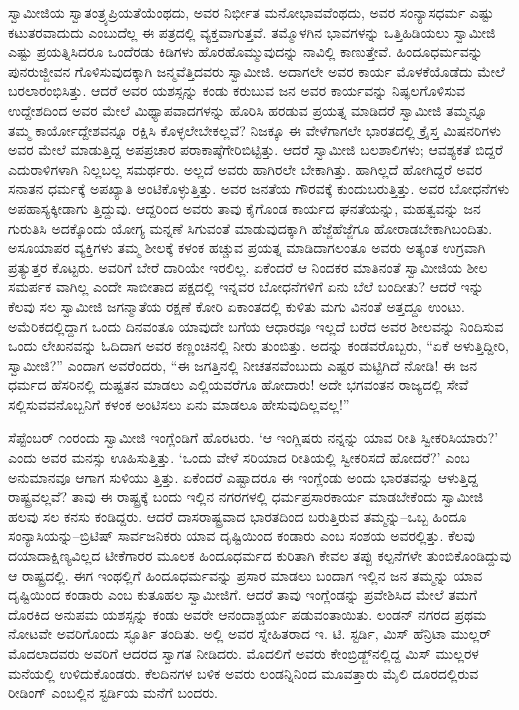ಸ್ವಾಮೀಜಿಯ ಸ್ವಾತಂತ್ರ್ಯಪ್ರಿಯತೆಯೆಂಥದು, ಅವರ ನಿರ್ಭೀತ ಮನೋಭಾವವೆಂಥದು, ಅವರ ಸಂನ್ಯಾಸಧರ್ಮ ಎಷ್ಟು ಕಟುತರವಾದುದು ಎಂಬುದೆಲ್ಲ ಈ ಪತ್ರದಲ್ಲಿ ವ್ಯಕ್ತವಾಗುತ್ತವೆ. ತಮ್ಮೊಳಗಿನ ಭಾವಗಳನ್ನು ಒತ್ತಿಹಿಡಿಯಲು ಸ್ವಾಮೀಜಿ ಎಷ್ಟು ಪ್ರಯತ್ನಿಸಿದರೂ ಒಂದೆರಡು ಕಿಡಿಗಳು ಹೊರಹೊಮ್ಮುವುದನ್ನು ನಾವಿಲ್ಲಿ ಕಾಣುತ್ತೇವೆ. ಹಿಂದೂಧರ್ಮವನ್ನು ಪುನರುಜ್ಜೀವನ ಗೊಳಿಸುವುದಕ್ಕಾಗಿ ಜನ್ಮವೆತ್ತಿದವರು ಸ್ವಾಮೀಜಿ. ಅದಾಗಲೇ ಅವರ ಕಾರ್ಯ ಮೊಳಕೆಯೊಡೆದು ಮೇಲೆ ಬರಲಾರಂಭಿಸಿತ್ತು. ಆದರೆ ಅವರ ಯಶಸ್ಸನ್ನು ಕಂಡು ಕರುಬುವ ಜನ ಅವರ ಕಾರ್ಯವನ್ನು ನಿಷ್ಫಲಗೊಳಿಸುವ ಉದ್ದೇಶದಿಂದ ಅವರ ಮೇಲೆ ಮಿಥ್ಯಾಪವಾದಗಳನ್ನು ಹೊರಿಸಿ ಹರಡುವ ಪ್ರಯತ್ನ ಮಾಡಿದರೆ ಸ್ವಾಮೀಜಿ ತಮ್ಮನ್ನೂ ತಮ್ಮ ಕಾರ್ಯೋದ್ದೇಶವನ್ನೂ ರಕ್ಷಿಸಿ ಕೊಳ್ಳಲೇಬೇಕಲ್ಲವೆ? ನಿಜಕ್ಕೂ ಈ ವೇಳೆಗಾಗಲೇ ಭಾರತದಲ್ಲಿ ಕ್ರೈಸ್ತ ಮಿಷನರಿಗಳು ಅವರ ಮೇಲೆ ಮಾಡುತ್ತಿದ್ದ ಅಪಪ್ರಚಾರ ಪರಾಕಾಷ್ಠೆಗೇರಿಬಿಟ್ಟಿತ್ತು. ಆದರೆ ಸ್ವಾಮೀಜಿ ಬಲಶಾಲಿಗಳು; ಆವಶ್ಯಕತೆ ಬಿದ್ದರೆ ಎದುರಾಳಿಗಳಾಗಿ ನಿಲ್ಲಬಲ್ಲ ಸಮರ್ಥರು. ಅಲ್ಲದೆ ಅವರು ಹಾಗಿರಲೇ ಬೇಕಾಗಿತ್ತು. ಹಾಗಿಲ್ಲದೆ ಹೋಗಿದ್ದರೆ ಅವರ ಸನಾತನ ಧರ್ಮಕ್ಕೆ ಅಪಖ್ಯಾತಿ ಅಂಟಿಕೊಳ್ಳುತ್ತಿತ್ತು. ಅವರ ಜನತೆಯ ಗೌರವಕ್ಕೆ ಕುಂದುಬರುತ್ತಿತ್ತು. ಅವರ ಬೋಧನೆಗಳು ಅಪಹಾಸ್ಯಕ್ಕೀಡಾಗು ತ್ತಿದ್ದುವು. ಆದ್ದರಿಂದ ಅವರು ತಾವು ಕೈಗೊಂಡ ಕಾರ್ಯದ ಘನತೆಯನ್ನು, ಮಹತ್ವವನ್ನು ಜನ ಗುರುತಿಸಿ ಅದಕ್ಕೊಂದು ಯೋಗ್ಯ ಮನ್ನಣೆ ಸಿಗುವಂತೆ ಮಾಡುವುದಕ್ಕಾಗಿ ಹೆಜ್ಜೆಹೆಜ್ಜೆಗೂ ಹೋರಾಡಬೇಕಾಗಿಬಂದಿತು. ಅಸೂಯಾಪರ ವ್ಯಕ್ತಿಗಳು ತಮ್ಮ ಶೀಲಕ್ಕೆ ಕಳಂಕ ಹಚ್ಚುವ ಪ್ರಯತ್ನ ಮಾಡಿದಾಗಲಂತೂ ಅವರು ಅತ್ಯಂತ ಉಗ್ರವಾಗಿ ಪ್ರತ್ಯುತ್ತರ ಕೊಟ್ಟರು. ಅವರಿಗೆ ಬೇರೆ ದಾರಿಯೇ ಇರಲಿಲ್ಲ. ಏಕೆಂದರೆ ಆ ನಿಂದಕರ ಮಾತಿನಂತೆ ಸ್ವಾಮೀಜಿಯ ಶೀಲ ಸಮರ್ಪಕ ವಾಗಿಲ್ಲ ಎಂದೇ ಸಾಬೀತಾದ ಪಕ್ಷದಲ್ಲಿ ಇನ್ನವರ ಬೋಧನೆಗಳಿಗೆ ಏನು ಬೆಲೆ ಬಂದೀತು? ಆದರೆ ಇನ್ನು ಕೆಲವು ಸಲ ಸ್ವಾಮೀಜಿ ಜಗನ್ಮಾತೆಯ ರಕ್ಷಣೆ ಕೋರಿ ಏಕಾಂತದಲ್ಲಿ ಕುಳಿತು ಮಗು ವಿನಂತೆ ಅತ್ತದ್ದೂ ಉಂಟು. ಅಮೆರಿಕದಲ್ಲಿದ್ದಾಗ ಒಂದು ದಿನವಂತೂ ಯಾವುದೇ ಬಗೆಯ ಆಧಾರವೂ ಇಲ್ಲದೆ ಬರೆದ ಅವರ ಶೀಲವನ್ನು ನಿಂದಿಸುವ ಒಂದು ಲೇಖನವನ್ನು ಓದಿದಾಗ ಅವರ ಕಣ್ಣಂಚಿನಲ್ಲಿ ನೀರು ತುಂಬಿತ್ತು. ಅದನ್ನು ಕಂಡವರೊಬ್ಬರು, “ಏಕೆ ಅಳುತ್ತಿದ್ದೀರಿ, ಸ್ವಾಮೀಜಿ?” ಎಂದಾಗ ಅವರೆಂದರು, “ಈ ಜಗತ್ತಿನಲ್ಲಿ ನೀಚತನವೆಂಬುದು ಎಷ್ಟರ ಮಟ್ಟಿಗಿದೆ ನೋಡಿ! ಈ ಜನ ಧರ್ಮದ ಹೆಸರಿನಲ್ಲಿ ದುಷ್ಟತನ ಮಾಡಲು ಎಲ್ಲಿಯವರೆಗೂ ಹೋದಾರು! ಅದೇ ಭಗವಂತನ ರಾಜ್ಯದಲ್ಲಿ ಸೇವೆ ಸಲ್ಲಿಸುವವನೊಬ್ಬನಿಗೆ ಕಳಂಕ ಅಂಟಿಸಲು ಏನು ಮಾಡಲೂ ಹೇಸುವುದಿಲ್ಲವಲ್ಲ!”

ಸೆಪ್ಟೆಂಬರ್ ೧ಂರಂದು ಸ್ವಾಮೀಜಿ ಇಂಗ್ಲೆಂಡಿಗೆ ಹೊರಟರು. ‘ಆ ಇಂಗ್ಲಿಷರು ನನ್ನನ್ನು ಯಾವ ರೀತಿ ಸ್ವೀಕರಿಸಿಯಾರು?’ ಎಂದು ಅವರ ಮನಸ್ಸು ಊಹಿಸುತ್ತಿತ್ತು. ‘ಒಂದು ವೇಳೆ ಸರಿಯಾದ ರೀತಿಯಲ್ಲಿ ಸ್ವೀಕರಿಸದೆ ಹೋದರೆ?’ ಎಂಬ ಅನುಮಾನವೂ ಆಗಾಗ ಸುಳಿಯು ತ್ತಿತ್ತು. ಏಕೆಂದರೆ ಎಷ್ಟಾದರೂ ಈ ಇಂಗ್ಲೆಂಡು ಅಂದು ಭಾರತವನ್ನು ಆಳುತ್ತಿದ್ದ ರಾಷ್ಟ್ರವಲ್ಲವೆ? ತಾವು ಈ ರಾಷ್ಟ್ರಕ್ಕೆ ಬಂದು ಇಲ್ಲಿನ ನಗರಗಳಲ್ಲಿ ಧರ್ಮಪ್ರಸಾರಕಾರ್ಯ ಮಾಡಬೇಕೆಂದು ಸ್ವಾಮೀಜಿ ಹಲವು ಸಲ ಕನಸು ಕಂಡಿದ್ದರು. ಆದರೆ ದಾಸರಾಷ್ಟ್ರವಾದ ಭಾರತದಿಂದ ಬರುತ್ತಿರುವ ತಮ್ಮನ್ನು–ಒಬ್ಬ ಹಿಂದೂ ಸಂನ್ಯಾಸಿಯನ್ನು–ಬ್ರಿಟಿಷ್ ಸಾರ್ವಜನಿಕರು ಯಾವ ದೃಷ್ಟಿಯಿಂದ ಕಂಡಾರು ಎಂಬ ಸಂಶಯ ಅವರಲ್ಲಿತ್ತು. ಕೆಲವು ದಯಾದಾಕ್ಷಿಣ್ಯವಿಲ್ಲದ ಟೀಕೆಗಾರರ ಮೂಲಕ ಹಿಂದೂಧರ್ಮದ ಕುರಿತಾಗಿ ಕೇವಲ ತಪ್ಪು ಕಲ್ಪನೆಗಳೇ ತುಂಬಿಕೊಂಡಿದ್ದುವು ಆ ರಾಷ್ಟ್ರದಲ್ಲಿ. ಈಗ ಇಂಥಲ್ಲಿಗೆ ಹಿಂದೂಧರ್ಮವನ್ನು ಪ್ರಸಾರ ಮಾಡಲು ಬಂದಾಗ ಇಲ್ಲಿನ ಜನ ತಮ್ಮನ್ನು ಯಾವ ದೃಷ್ಟಿಯಿಂದ ಕಂಡಾರು ಎಂಬ ಕುತೂಹಲ ಸ್ವಾಮೀಜಿಗೆ. ಆದರೆ ತಾವು ಇಂಗ್ಲೆಂಡನ್ನು ಪ್ರವೇಶಿಸಿದ ಮೇಲೆ ತಮಗೆ ದೊರಕಿದ ಅನುಪಮ ಯಶಸ್ಸನ್ನು ಕಂಡು ಅವರೇ ಆನಂದಾಶ್ಚರ್ಯ ಪಡುವಂತಾಯಿತು. ಲಂಡನ್ ನಗರದ ಪ್ರಥಮ ನೋಟವೇ ಅವರಿಗೊಂದು ಸ್ಫೂರ್ತಿ ತಂದಿತು. ಅಲ್ಲಿ ಅವರ ಸ್ನೇಹಿತರಾದ ಇ. ಟಿ. ಸ್ಟರ್ಡಿ, ಮಿಸ್ ಹೆನ್ರಿಟಾ ಮುಲ್ಲರ್ ಮೊದಲಾದವರು ಅವರಿಗೆ ಆದರದ ಸ್ವಾಗತ ನೀಡಿದರು. ಮೊದಲಿಗೆ ಅವರು ಕೇಂಬ್ರಿಡ್ಜ್​ನಲ್ಲಿದ್ದ ಮಿಸ್ ಮುಲ್ಲರಳ ಮನೆಯಲ್ಲಿ ಉಳಿದುಕೊಂಡರು. ಕೆಲದಿನಗಳ ಬಳಿಕ ಅವರು ಲಂಡನ್ನಿನಿಂದ ಮೂವತ್ತಾರು ಮೈಲಿ ದೂರದಲ್ಲಿರುವ ರೀಡಿಂಗ್ ಎಂಬಲ್ಲಿನ ಸ್ಟರ್ಡಿಯ ಮನೆಗೆ ಬಂದರು.

